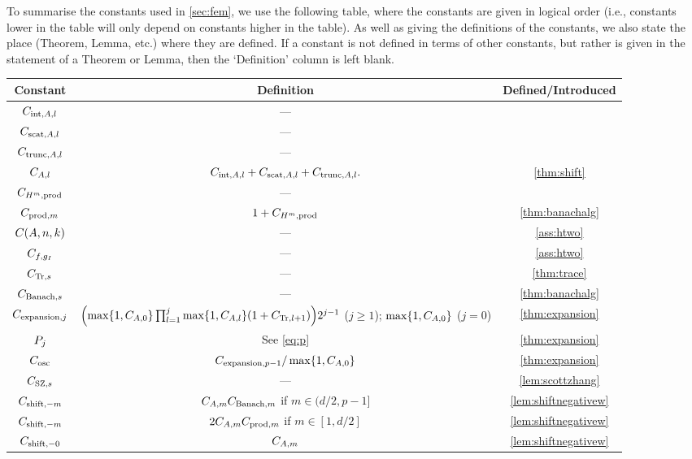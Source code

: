 To summarise the constants used in \cref{sec:fem}, we use the following table, where the constants are given in logical order (i.e., constants lower in the table will only depend on constants higher in the table). As well as giving the definitions of the constants, we also state the place (Theorem, Lemma, etc.) where they are defined. If a constant is not defined in terms of other constants, but rather is given in the statement of a Theorem or Lemma, then the `Definition' column is left blank.

\begin{longtabu}{ccc}
  \toprule
  Constant & Definition & Defined/Introduced\\
  \midrule
  \endhead
  $C_{\mathrm{int},A,l}$ & ---& \cite[Theorem 4.16]{Mc:00}\\
  $C_{\mathrm{scat},A,l}$ & ---& \cite[Theorem 4.18(i)]{Mc:00}\\
    $C_{\mathrm{trunc},A,l}$ & ---& \cite[Theorem 4.18(ii)]{Mc:00}\\
  $C_{A,l}$ & $C_{\mathrm{int},A,l} + C_{\mathrm{scat},A,l} + C_{\mathrm{trunc},A,l}.$ & \cref{thm:shift}\\
  $C_{H^{m},\mathrm{prod}}$&---&\cite[Theorem 3.20]{Mc:00}\\ 
  $C_{\mathrm{prod},m}$ &$1+C_{H^{m},\mathrm{prod}}$&\cref{thm:banachalg} \\
  $\CAnk$ &---& \cref{ass:htwo}\\
  $C_{f,g_{I}}$ &---& \cref{ass:htwo}\\
  $C_{\mathrm{Tr},s}$ &---& \cref{thm:trace}\\
  $C_{\mathrm{Banach},s}$ & --- & \cref{thm:banachalg}\\
  $C_{\mathrm{expansion},j}$ & $\mleft(\max\set{1,\CAz} \prod_{l=1}^j \max\set{1,\CAfn{l}} \mleft(1+\CTrfn{l+1}\mright)\mright)2^{j-1}$ ($j \geq 1$); $\max\set{1,\CAz}$ ($j=0$)& \cref{thm:expansion}\\
  $P_{j}$ & See \cref{eq:p}& \cref{thm:expansion}\\
  $C_{\mathrm{osc}}$ & $\Cefn{p-1}/\max\set{1,\CAz}$ & \cref{thm:expansion}\\
  $C_{\mathrm{SZ},s}$ &---& \cref{lem:scottzhang}\\
  $C_{\mathrm{shift},-m}$ &$C_{A,m}C_{\mathrm{Banach},m}$ if $ m \in (d/2,p-1]$& \cref{lem:shiftnegativew}\\
    $C_{\mathrm{shift},-m}$ &$2C_{A,m}C_{\mathrm{prod},m}$ if $m \in [1,d/2]$& \cref{lem:shiftnegativew}\\
      $C_{\mathrm{shift},-0}$ &$C_{A,m}$& \cref{lem:shiftnegativew}\\

\end{longtabu}
